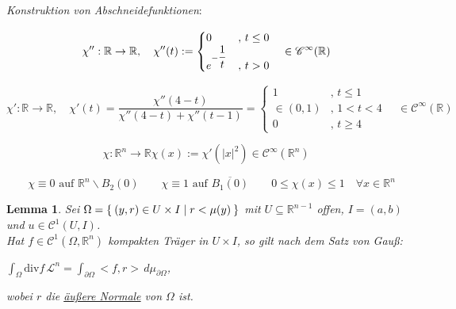 \documentclass[11pt]{memoir}
\theoremstyle{changebreak}
\newtheorem{Lemma}{Lemma}[chapter]
\begin{document}
\par\bigskip
\emph{Konstruktion von Abschneidefunktionen}: 
\par\bigskip
\begin{equation}
	\chi '': \mathbb R \rightarrow \mathbb R, 
	\quad \chi''(t) :=
	\begin{cases}
		0 & , \,t \leq 0 \\
		e^{-\dfrac{1}{t}} & ,\,t > 0
	\end{cases}
	\quad \in \mathscr C^\infty(\mathbb R) \\
\end{equation}
\par
\begin{equation}
	\chi': \mathbb R \rightarrow \mathbb R, \quad \chi'(t) =
	\dfrac{\chi''(4-t)}{\chi''(4-t) + \chi''(t-1)} =
	\begin{cases}
		1 & , \, t \leq 1 \\
		\in (0, 1) &, \, 1 < t < 4 \\
		0 & ,\, t \geq 4
	\end{cases}
	\quad \in \mathscr C^\infty(\mathbb R)
\end{equation}
\par
\begin{equation}
	\chi: \mathbb R^n \rightarrow \mathbb R
	\chi(x) := \chi'(|x|^2) \in \mathscr C^\infty (\mathbb R^n)
\end{equation}
\par
\begin{equation}
	\quad \chi \equiv 0 \text{ auf } \mathbb R^n\backslash B_2(0)
	\qquad \chi \equiv 1\text{ auf }\overline{B_1(0)}
	\qquad 0 \leq \chi(x) \leq 1 \quad \forall x \in \mathbb R^n
\end{equation}

\begin{Lemma}
Sei $\Omega = \Set{(y, r) \in U \times I | r < \mu(y)}$ mit $U \subseteq \mathbb R^{n-1}$ offen, $I = (a, b)$ und $u \in \mathscr C^1(U, I)$. \\
Hat $f \in \mathscr C^1(\Omega, \mathbb R^n)$ kompakten Träger in $U \times I$, so gilt nach dem Satz von Gauß:
\begin{center}
	$\int_{\Omega} \text{div} f \, \mathscr L^n = \int_{\partial \Omega} <f, r> \, d\mu_{\partial\Omega}$,
\end{center}
wobei $r$ die \underline{äußere Normale} von $\Omega$ ist.
\end{Lemma}
\end{document}
